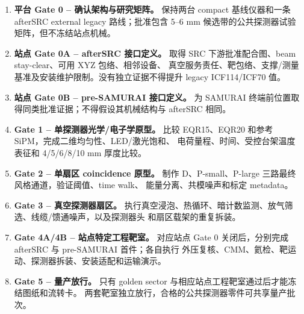 \documentclass[UTF8,10pt,letterpaper,fontset=none]{ctexart}
\begin{document}
\begin{enumerate}
  \item \textbf{平台 Gate 0 -- 确认架构与研究矩阵。}
    保持两台 compact 基线仪器和一条 afterSRC external legacy 路线；批准包含
    5--6 mm 候选带的公共探测器试验矩阵，但不冻结站点机械。
  \item \textbf{站点 Gate 0A -- afterSRC 接口定义。}
    取得 SRC 下游批准配合图、beam stay-clear、可用 XYZ 包络、相邻设备、
    真空服务责任、靶包络、支撑/测量基准及安装维护限制。没有独立证据不得提升
    legacy ICF114/ICF70 值。
  \item \textbf{站点 Gate 0B -- pre-SAMURAI 接口定义。}
    为 SAMURAI 终端前位置取得同类批准证据；不得假设其机械结构与 afterSRC 相同。
  \item \textbf{Gate 1 -- 单探测器光学/电子学原型。}
    比较 EQR15、EQR20 和参考 SiPM，完成二维均匀性、LED/激光饱和、
    电荷量程、时间、受控台架温度表征和 4/5/6/8/10 mm 厚度比较。
  \item \textbf{Gate 2 -- 单扇区 coincidence 原型。}
    制作 D、P-small、P-large 三路最终风格通道，验证阈值、time walk、
    能量分离、共模噪声和标定 metadata。
  \item \textbf{Gate 3 -- 真空探测器扇区。}
    执行真空浸泡、热循环、暗计数监测、放气筛选、线缆/馈通噪声，以及探测器头
    和扇区载架的重复拆装。
  \item \textbf{Gate 4A/4B -- 站点特定工程靶室。}
    对应站点 Gate 0 关闭后，分别完成 afterSRC 与 pre-SAMURAI 首件；各自执行
    外压复核、CMM、氦检、靶运动、探测器拆装、安装适配和运输演示。
  \item \textbf{Gate 5 -- 量产放行。}
    只有 golden sector 与相应站点工程靶室通过后才能冻结图纸和流转卡。
    两套靶室独立放行，合格的公共探测器零件可共享量产批次。
\end{enumerate}
\end{document}
